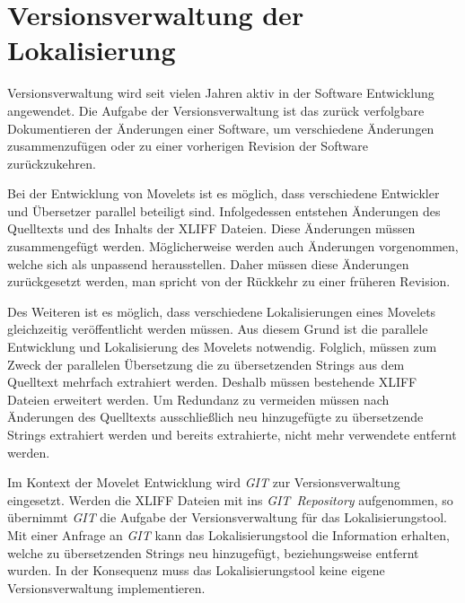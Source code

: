 \chapter{Versionsverwaltung der Lokalisierung}
\label{chp:version}
Versionsverwaltung wird seit vielen Jahren aktiv in der Software Entwicklung angewendet. Die Aufgabe der Versionsverwaltung ist das zurück verfolgbare Dokumentieren der Änderungen einer Software, um verschiedene Änderungen zusammenzufügen oder zu einer vorherigen Revision der Software zurückzukehren.
\autocite[Vgl.][S. 698ff]{Sommerville.2007}
\autocite[Vgl.][S. 751ff]{Pressman.2005}

Bei der Entwicklung von Movelets ist es möglich, dass verschiedene Entwickler und Übersetzer parallel beteiligt sind. Infolgedessen entstehen Änderungen des Quelltexts und des Inhalts der \ac{XLIFF} Dateien. Diese Änderungen müssen zusammengefügt werden. Möglicherweise werden auch Änderungen vorgenommen, welche sich als unpassend herausstellen. Daher müssen diese Änderungen zurückgesetzt werden, man spricht von der Rückkehr zu einer früheren Revision. 
\par
Des Weiteren ist es möglich, dass verschiedene Lokalisierungen eines Movelets gleichzeitig veröffentlicht werden müssen. Aus diesem Grund ist die parallele Entwicklung und Lokalisierung des Movelets notwendig. Folglich, müssen zum Zweck der parallelen Übersetzung die zu übersetzenden Strings aus dem Quelltext mehrfach extrahiert werden. Deshalb müssen bestehende \ac{XLIFF} Dateien erweitert werden. Um Redundanz zu vermeiden müssen nach Änderungen des Quelltexts ausschließlich neu hinzugefügte zu übersetzende Strings extrahiert werden und bereits extrahierte, nicht mehr verwendete entfernt werden.
\par
Im Kontext der Movelet Entwicklung wird \mbox{\textit{GIT}} zur Versionsverwaltung eingesetzt. Werden die \ac{XLIFF} Dateien mit ins \mbox{\textit{GIT Repository}} aufgenommen, so übernimmt \mbox{\textit{GIT}} die Aufgabe der Versionsverwaltung für das Lokalisierungstool. Mit einer Anfrage an \mbox{\textit{GIT}} kann das Lokalisierungstool die Information erhalten, welche zu übersetzenden Strings neu hinzugefügt, beziehungsweise entfernt wurden. In der Konsequenz muss das Lokalisierungstool keine eigene Versionsverwaltung implementieren.